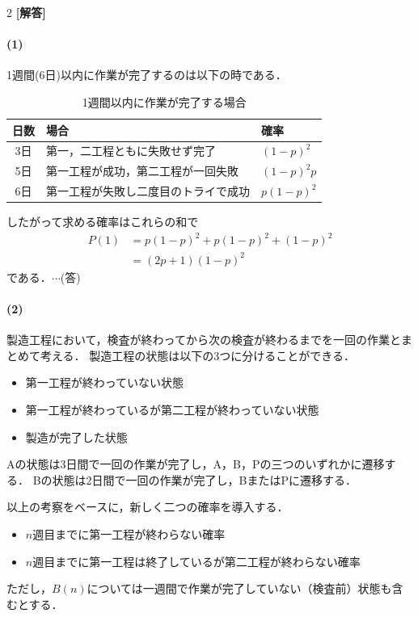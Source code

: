 \documentclass[../../main.tex]{subfiles}
\begin{document}
\setcounter{equation}{0}
\begin{oframed}
  
\end{oframed}
\setlength{\columnseprule}{0.4pt}
\begin{multicols}{2}
  {\bf [解答]}

  \paragraph{(1)}
  1週間(6日)以内に作業が完了するのは以下の時である．
  \begin{table}[H]
    \centering
    \caption{1週間以内に作業が完了する場合}
    \label{1994-3:table:1}
    \begin{tabular}{|c||l|l|} \hline
      日数 & 場合                 & 確率         \\ \hline\hline
      3日 & 第一，二工程ともに失敗せず完了    & $(1-p)^2$  \\ \hline
      5日 & 第一工程が成功，第二工程が一回失敗  & $(1-p)^2p$ \\ \hline
      6日 & 第一工程が失敗し二度目のトライで成功 & $p(1-p)^2$ \\ \hline
    \end{tabular}
  \end{table}

  したがって求める確率はこれらの和で
  \begin{align}
    P(1)
    & = p(1-p)^2 + p(1-p)^2 + (1-p)^2      \\
    & = (2p+1)(1-p)^2  \label{eq:1}
  \end{align}
  である．$\cdots$(答)

  \paragraph{(2)}
  製造工程において，検査が終わってから次の検査が終わるまでを一回の作業とまとめて考える．
  製造工程の状態は以下の3つに分けることができる．
  \begin{itemize}
    \item[A] 第一工程が終わっていない状態
    \item[B] 第一工程が終わっているが第二工程が終わっていない状態
    \item[P] 製造が完了した状態
  \end{itemize}
  Aの状態は3日間で一回の作業が完了し，A，B，Pの三つのいずれかに遷移する．
  Bの状態は2日間で一回の作業が完了し，BまたはPに遷移する．

  以上の考察をベースに，新しく二つの確率を導入する．
  \begin{itemize}
    \item[$A(n)$] $n$週目までに第一工程が終わらない確率
    \item[$B(n)$] $n$週目までに第一工程は終了しているが第二工程が終わらない確率
  \end{itemize}
  ただし，$B(n)$については一週間で作業が完了していない（検査前）状態も含むとする．


\end{multicols}
\end{document}
